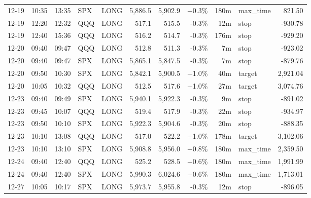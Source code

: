 \documentclass[11pt,a4paper,twoside]{article}
\begin{document}
\begin{center}
\begin{longtable}{>{\color{txtmain}}l l l l l r r r r >{\color{txtmain}}l r}
12-19 & 10:35 & 13:35 & SPX & LONG & 5,886.5 & 5,902.9 & \textcolor{wingreen}{+0.3\%} & 180m & max\_time & \textcolor{wingreen}{821.50} \\
12-19 & 12:20 & 12:32 & QQQ & LONG & 517.1 & 515.5 & \textcolor{lossred}{-0.3\%} & 12m & stop & \textcolor{lossred}{-930.78} \\
12-19 & 12:40 & 15:36 & QQQ & LONG & 516.2 & 514.7 & \textcolor{lossred}{-0.3\%} & 176m & stop & \textcolor{lossred}{-929.20} \\
12-20 & 09:40 & 09:47 & QQQ & LONG & 512.8 & 511.3 & \textcolor{lossred}{-0.3\%} & 7m & stop & \textcolor{lossred}{-923.02} \\
12-20 & 09:40 & 09:47 & SPX & LONG & 5,865.1 & 5,847.5 & \textcolor{lossred}{-0.3\%} & 7m & stop & \textcolor{lossred}{-879.76} \\
12-20 & 09:50 & 10:30 & SPX & LONG & 5,842.1 & 5,900.5 & \textcolor{wingreen}{+1.0\%} & 40m & target & \textcolor{wingreen}{2,921.04} \\
12-20 & 10:05 & 10:32 & QQQ & LONG & 512.5 & 517.6 & \textcolor{wingreen}{+1.0\%} & 27m & target & \textcolor{wingreen}{3,074.76} \\
12-23 & 09:40 & 09:49 & SPX & LONG & 5,940.1 & 5,922.3 & \textcolor{lossred}{-0.3\%} & 9m & stop & \textcolor{lossred}{-891.02} \\
12-23 & 09:45 & 10:07 & QQQ & LONG & 519.4 & 517.9 & \textcolor{lossred}{-0.3\%} & 22m & stop & \textcolor{lossred}{-934.97} \\
12-23 & 09:50 & 10:10 & SPX & LONG & 5,922.3 & 5,904.6 & \textcolor{lossred}{-0.3\%} & 20m & stop & \textcolor{lossred}{-888.35} \\
12-23 & 10:10 & 13:08 & QQQ & LONG & 517.0 & 522.2 & \textcolor{wingreen}{+1.0\%} & 178m & target & \textcolor{wingreen}{3,102.06} \\
12-23 & 10:10 & 13:10 & SPX & LONG & 5,908.8 & 5,956.0 & \textcolor{wingreen}{+0.8\%} & 180m & max\_time & \textcolor{wingreen}{2,359.50} \\
12-24 & 09:40 & 12:40 & QQQ & LONG & 525.2 & 528.5 & \textcolor{wingreen}{+0.6\%} & 180m & max\_time & \textcolor{wingreen}{1,991.99} \\
12-24 & 09:40 & 12:40 & SPX & LONG & 5,990.3 & 6,024.6 & \textcolor{wingreen}{+0.6\%} & 180m & max\_time & \textcolor{wingreen}{1,713.01} \\
12-27 & 10:05 & 10:17 & SPX & LONG & 5,973.7 & 5,955.8 & \textcolor{lossred}{-0.3\%} & 12m & stop & \textcolor{lossred}{-896.05} \\

\end{longtable}
\end{center}
\end{document}
